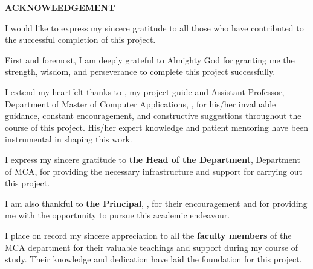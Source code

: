 \thispagestyle{plain}
\begin{center}
  \vspace*{1cm}
  {\LARGE \textbf{ACKNOWLEDGEMENT}}\\[2cm]
\end{center}

\begin{center}
  \begin{minipage}{0.85\textwidth}
    \large

    \noindent I would like to express my sincere gratitude to all those who have contributed to the successful completion of this project.

    \vspace{0.5cm}

    \noindent First and foremost, I am deeply grateful to Almighty God for granting me the strength, wisdom, and perseverance to complete this project successfully.

    \vspace{0.5cm}

    \noindent I extend my heartfelt thanks to \textbf{\guideName}, my project guide and Assistant Professor, Department of Master of Computer Applications, \collegeName, for his/her invaluable guidance, constant encouragement, and constructive suggestions throughout the course of this project. His/her expert knowledge and patient mentoring have been instrumental in shaping this work.

    \vspace{0.5cm}

    \noindent I express my sincere gratitude to \textbf{the Head of the Department}, Department of MCA, for providing the necessary infrastructure and support for carrying out this project.

    \vspace{0.5cm}

    \noindent I am also thankful to \textbf{the Principal}, \collegeName, for their encouragement and for providing me with the opportunity to pursue this academic endeavour.

    \vspace{0.5cm}

    \noindent I place on record my sincere appreciation to all the \textbf{faculty members} of the MCA department for their valuable teachings and support during my course of study. Their knowledge and dedication have laid the foundation for this project.


\end{minipage}
\end{center}
